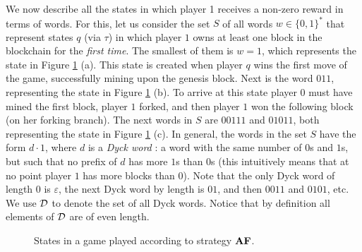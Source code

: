 We now  describe all the states in which player 1 receives a non-zero reward in terms of words. For this, let us consider the set $S$ of all words $w \in \{0,1\}^*$ that represent states $q$ (via $\tau$) in which player $1$ owns at least one block in the blockchain for the {\em first time}. 
The smallest of them is $w = 1$, which represents the state in Figure \ref{fig:proof-theorem-4-app} (a). This state is created when player $q$ wins the first move of the game, successfully mining upon the genesis block. Next is the word $011$, representing the state in Figure \ref{fig:proof-theorem-4-app} (b). To arrive at this state player $0$ must have mined the first block, player $1$ forked, and then player $1$ 
won the following block (on her forking branch). The next words in $S$ are $00111$ and $01011$, both representing the state in Figure \ref{fig:proof-theorem-4-app} (c). 
In general, the words in the set $S$ have the form $d\cdot 1$, where $d$ is a \emph{Dyck word} \cite{Dyck}: a word with the same number of $0$s and $1$s, but such that 
no prefix of $d$ has more $1$s than $0$s (this intuitively means that at no point player $1$ has more blocks than $0$). 
Note that the only Dyck word of length $0$ is $\varepsilon$, the next Dyck word by length is $01$, and then $0011$ and $0101$, etc. We use $\mathcal{D}$ to denote the set of all Dyck words. Notice that by definition all elements of $\mathcal{D}$ are of even length.

\begin{figure}
\begin{center}
\end{center}

\caption{States in a game played according to strategy $\text{\rm {\bf AF}}$. \label{fig:proof-theorem-4-app}}
\end{figure}

